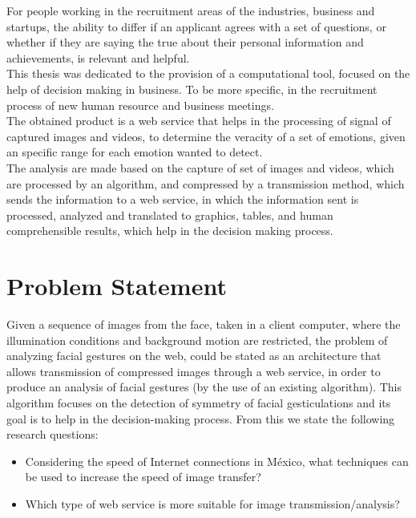 \documentclass[12pt,letterpaper,titlepage]{book}
\begin{document}
For people working in the recruitment areas of the industries, business and startups, the ability to differ if an applicant agrees with a set of questions, or whether if they are saying the true about their personal information and achievements, is relevant and helpful.\\

This thesis was dedicated to the provision of a computational tool, focused on the help of decision making in business. To be more specific, in the recruitment process of new human resource and business meetings.\\

The obtained product is a web service that helps in the processing of signal of captured images and videos, to determine the veracity of a set of emotions, given an specific range for each emotion wanted to detect.\\

The analysis are made based on the capture of set of images and videos, which are processed by an algorithm, and compressed by a transmission method, which sends the information to a web service, in which the information sent is processed, analyzed and translated to graphics, tables, and human comprehensible results, which help in the decision making process.\\

\section{Problem Statement}\label{problemstatement}
Given a sequence of images from the face, taken in a client computer, where the illumination conditions and background motion are restricted, the problem of analyzing facial gestures on the web, could be stated as an architecture that allows transmission of compressed images through a web service, in order to produce an analysis of facial gestures (by the use of an existing algorithm). This algorithm focuses on the detection of symmetry of facial gesticulations and its goal is to help in the decision-making process. From this we state the following research questions:
\begin{itemize}
\item Considering the speed of Internet connections in M\'exico, what techniques can be used to increase the speed of image transfer?
\item Which type of web service is more suitable for image transmission/analysis?
\end{itemize}
\end{document}
